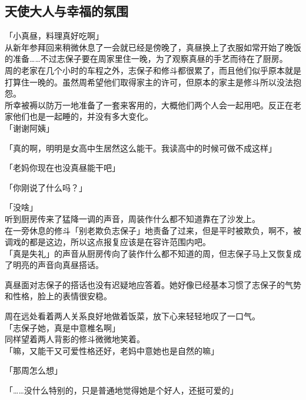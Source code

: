 \subsection{天使大人与幸福的氛围}

「小真昼，料理真好吃啊」\\

从新年参拜回来稍微休息了一会就已经是傍晚了，真昼换上了衣服如常开始了晚饭的准备……不过志保子要在周家里住一晚，为了观察真昼的手艺而待在了厨房。\\

周的老家在几个小时的车程之外，志保子和修斗都很累了，而且他们似乎原本就是打算住一晚的。虽然周希望他们取得家主的许可，但原本的家主是修斗所以没法抱怨。\\

所幸被褥以防万一地准备了一套来客用的，大概他们两个人会一起用吧。反正在老家他们也是一起睡的，并没有多大变化。\\

「谢谢阿姨」

「真的啊，明明是女高中生居然这么能干。我读高中的时候可做不成这样」

「老妈你现在也没真昼能干吧」

「你刚说了什么吗？」

「没啥」\\

听到厨房传来了猛降一调的声音，周装作什么都不知道靠在了沙发上。\\

在一旁休息的修斗「别老欺负志保子」地责备了过来，但是平时被欺负，啊不，被调戏的都是这边，所以这点报复应该是在容许范围内吧。\\

「真是失礼」的声音从厨房传向了装作什么都不知道的周，但志保子马上又恢复成了明亮的声音向真昼搭话。

真昼面对志保子的搭话也没有迟疑地应答着。她好像已经基本习惯了志保子的气势和性格，脸上的表情很安稳。

周在远处看着两人关系良好地做着饭菜，放下心来轻轻地叹了一口气。\\

「志保子她，真是中意椎名啊」\\

同样望着两人背影的修斗微微地笑着。\\

「嘛，又能干又可爱性格还好，老妈中意她也是自然的嘛」

「那周怎么想」

「……没什么特别的，只是普通地觉得她是个好人，还挺可爱的」

